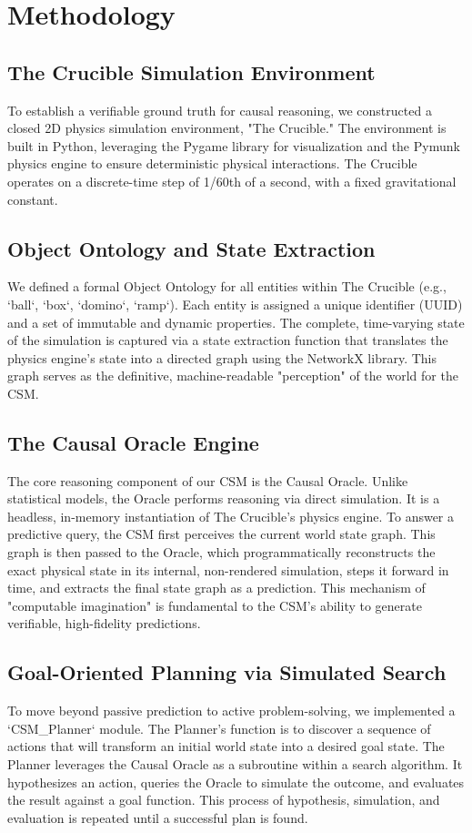 \documentclass[11pt, letterpaper]{article}
\begin{document}
\section{Methodology}

\subsection{The Crucible Simulation Environment}
To establish a verifiable ground truth for causal reasoning, we constructed a closed 2D physics simulation environment, "The Crucible." The environment is built in Python, leveraging the Pygame library for visualization and the Pymunk physics engine to ensure deterministic physical interactions. The Crucible operates on a discrete-time step of 1/60th of a second, with a fixed gravitational constant.

\subsection{Object Ontology and State Extraction}
We defined a formal Object Ontology for all entities within The Crucible (e.g., `ball`, `box`, `domino`, `ramp`). Each entity is assigned a unique identifier (UUID) and a set of immutable and dynamic properties. The complete, time-varying state of the simulation is captured via a state extraction function that translates the physics engine's state into a directed graph using the NetworkX library. This graph serves as the definitive, machine-readable "perception" of the world for the CSM.

\subsection{The Causal Oracle Engine}
The core reasoning component of our CSM is the Causal Oracle. Unlike statistical models, the Oracle performs reasoning via direct simulation. It is a headless, in-memory instantiation of The Crucible's physics engine. To answer a predictive query, the CSM first perceives the current world state graph. This graph is then passed to the Oracle, which programmatically reconstructs the exact physical state in its internal, non-rendered simulation, steps it forward in time, and extracts the final state graph as a prediction. This mechanism of "computable imagination" is fundamental to the CSM's ability to generate verifiable, high-fidelity predictions.

\subsection{Goal-Oriented Planning via Simulated Search}
To move beyond passive prediction to active problem-solving, we implemented a `CSM_Planner` module. The Planner's function is to discover a sequence of actions that will transform an initial world state into a desired goal state. The Planner leverages the Causal Oracle as a subroutine within a search algorithm. It hypothesizes an action, queries the Oracle to simulate the outcome, and evaluates the result against a goal function. This process of hypothesis, simulation, and evaluation is repeated until a successful plan is found.
\end{document}
